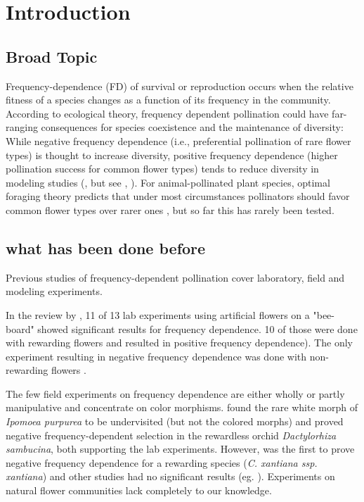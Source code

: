 \section{Introduction}


\subsection*{Broad Topic}

Frequency-dependence (FD) of survival or reproduction occurs when the relative fitness of a species changes as a function of its frequency in the community. According to ecological theory, frequency dependent pollination could have far-ranging consequences for species coexistence and the maintenance of diversity: While negative frequency dependence (i.e., preferential pollination of rare flower types) is thought to increase diversity, positive frequency dependence (higher pollination success for common flower types) tends to reduce diversity in modeling studies (\citealt{may1974stability}, but see \citealt{bever1999dynamics}, \citealt{molofsky2002novel}).
For animal-pollinated plant species, optimal foraging theory predicts that under most circumstances pollinators should favor common flower types over rarer ones \citep{kunin1996pollinator}, but so far this has rarely been tested. 


\subsection*{what has been done before}

Previous studies of frequency-dependent pollination cover laboratory, field and modeling experiments.

In the review by \cite{smithson2001pollinator}, 11 of 13 lab experiments using artificial flowers on a "bee-board" showed significant results for frequency dependence. 10 of those were done with rewarding flowers and resulted in positive frequency dependence\citep{smithson1996frequency,smithson1997density}). The only experiment resulting in negative frequency dependence was done with non-rewarding flowers \citep{smithson1997negative}. 

The few field experiments on frequency dependence are either wholly or partly manipulative and concentrate on color morphisms. \cite{epperson1987frequency} found the rare white morph of \textit{Ipomoea purpurea} to be undervisited (but not the colored morphs) and \cite{gigord2001negative} proved negative frequency-dependent selection in the rewardless orchid \textit{Dactylorhiza sambucina}, both supporting the lab experiments. However, \cite{Eckhart2006frequency} was the first to prove negative frequency dependence for a rewarding species (\textit{C. xantiana ssp. xantiana}) and other studies had no significant results (eg. \citealt{jones1996pollinator, mogford1978pollination}). Experiments on natural flower communities lack completely to our knowledge. 

